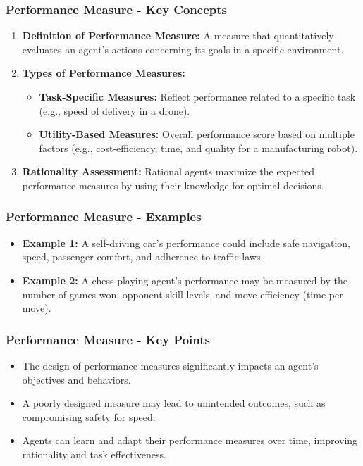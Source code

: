 \documentclass[aspectratio=169]{beamer}
\begin{document}
\begin{frame}[fragile]
    \frametitle{Performance Measure - Key Concepts}
    \begin{enumerate}
        \item \textbf{Definition of Performance Measure:} A measure that quantitatively evaluates an agent's actions concerning its goals in a specific environment.
        
        \item \textbf{Types of Performance Measures:}
        \begin{itemize}
            \item \textbf{Task-Specific Measures:} Reflect performance related to a specific task (e.g., speed of delivery in a drone).
            \item \textbf{Utility-Based Measures:} Overall performance score based on multiple factors (e.g., cost-efficiency, time, and quality for a manufacturing robot).
        \end{itemize}
        
        \item \textbf{Rationality Assessment:} Rational agents maximize the expected performance measures by using their knowledge for optimal decisions.
    \end{enumerate}
\end{frame}

\begin{frame}[fragile]
    \frametitle{Performance Measure - Examples}
    \begin{itemize}
        \item \textbf{Example 1:} A self-driving car's performance could include safe navigation, speed, passenger comfort, and adherence to traffic laws.
        \item \textbf{Example 2:} A chess-playing agent's performance may be measured by the number of games won, opponent skill levels, and move efficiency (time per move).
    \end{itemize}
\end{frame}

\begin{frame}[fragile]
    \frametitle{Performance Measure - Key Points}
    \begin{itemize}
        \item The design of performance measures significantly impacts an agent's objectives and behaviors.
        \item A poorly designed measure may lead to unintended outcomes, such as compromising safety for speed.
        \item Agents can learn and adapt their performance measures over time, improving rationality and task effectiveness.
    \end{itemize}
\end{frame}
\end{document}
